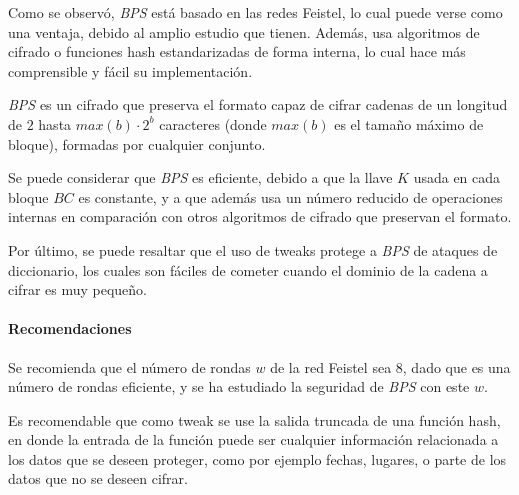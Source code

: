 Como se observó, \textit{BPS} está basado en las redes Feistel, lo cual puede
verse como una ventaja, debido al amplio estudio que tienen. Además, usa
algoritmos de cifrado o funciones hash estandarizadas de forma interna, lo
cual hace más comprensible y fácil su implementación.

\textit{BPS} es un cifrado que preserva el formato capaz de cifrar cadenas de
un longitud de $2$ hasta $max(b) \cdot 2^{b}$ caracteres (donde $max(b)$ es el
tamaño máximo de bloque), formadas por cualquier conjunto.

Se puede considerar que \textit{BPS} es eficiente, debido a que la llave $K$
usada en cada bloque $BC$ es constante, y a que además usa un número reducido
de operaciones internas en comparación con otros algoritmos de cifrado que
preservan el formato.

Por último, se puede resaltar que el uso de tweaks protege a \textit{BPS} de
ataques de diccionario, los cuales son fáciles de cometer cuando el dominio
de la cadena a cifrar es muy pequeño.


\paragraph{Recomendaciones}

Se recomienda que el número de rondas $w$ de la red Feistel sea $8$, dado
que es una número de rondas eficiente, y se ha estudiado la seguridad de
\textit{BPS} con este $w$.

Es recomendable que como tweak se use la salida truncada de una función hash,
en donde la entrada de la función puede ser cualquier información relacionada
a los datos que se deseen proteger, como por ejemplo fechas, lugares, o parte
de los datos que no se deseen cifrar.
